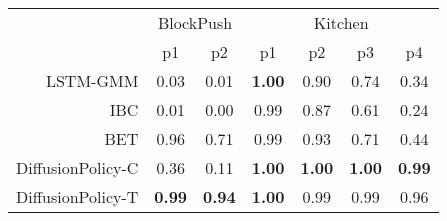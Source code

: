 
\setlength\tabcolsep{4.8 pt}
\begin{tabular}{r|cc|cccc}
\toprule
 & \multicolumn{2}{c|}{BlockPush} & \multicolumn{4}{c}{Kitchen} \\
 & p1 & p2 & p1 & p2 & p3 & p4 \\
\midrule
LSTM-GMM & \small 0.03 & \small 0.01 & \small \textbf{1.00} & \small 0.90 & \small 0.74 & \small 0.34 \\
IBC & \small 0.01 & \small 0.00 & \small 0.99 & \small 0.87 & \small 0.61 & \small 0.24 \\
BET & \small 0.96 & \small 0.71 & \small 0.99 & \small 0.93 & \small 0.71 & \small 0.44 \\
DiffusionPolicy-C & \small 0.36 & \small 0.11 & \small \textbf{1.00} & \small \textbf{1.00} & \small \textbf{1.00} & \small \textbf{0.99} \\
DiffusionPolicy-T & \small \textbf{0.99} & \small \textbf{0.94} & \small \textbf{1.00} & \small 0.99 & \small 0.99 & \small 0.96 \\
\bottomrule
\end{tabular}
